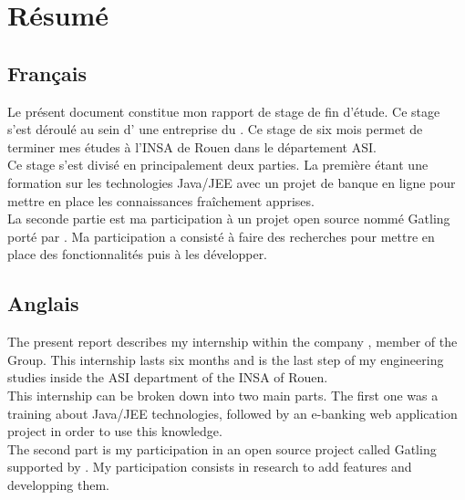 \newpage

\mbox{}

\chapter*{Résumé}

\section*{Français}

Le présent document constitue mon rapport de stage de fin d'étude. Ce stage s'est déroulé au sein d'\ebi{} une entreprise du \excilysGroup{}. Ce stage de six mois permet de terminer mes études à l'INSA de Rouen dans le département ASI.\\

Ce stage s'est divisé en principalement deux parties. La première étant une formation sur les technologies Java/JEE avec un projet de banque en ligne pour mettre en place les connaissances fraîchement apprises.\\

La seconde partie est ma participation à un projet open source nommé Gatling porté par \ebi{}. Ma participation a consisté à faire des recherches pour mettre en place des fonctionnalités puis à les développer.

\section*{Anglais}

The present report describes my internship within the company \ebi{}, member of the \excilys{} Group. This internship lasts six months and is the last step of my engineering studies inside the ASI department of the INSA of Rouen.\\

This internship can be broken down into two main parts. The first one was a training about Java/JEE technologies, followed by an e-banking web application project in order to use this knowledge.\\

The second part is my participation in an open source project called Gatling supported by \ebi{}. My participation consists in research to add features and developping them.
